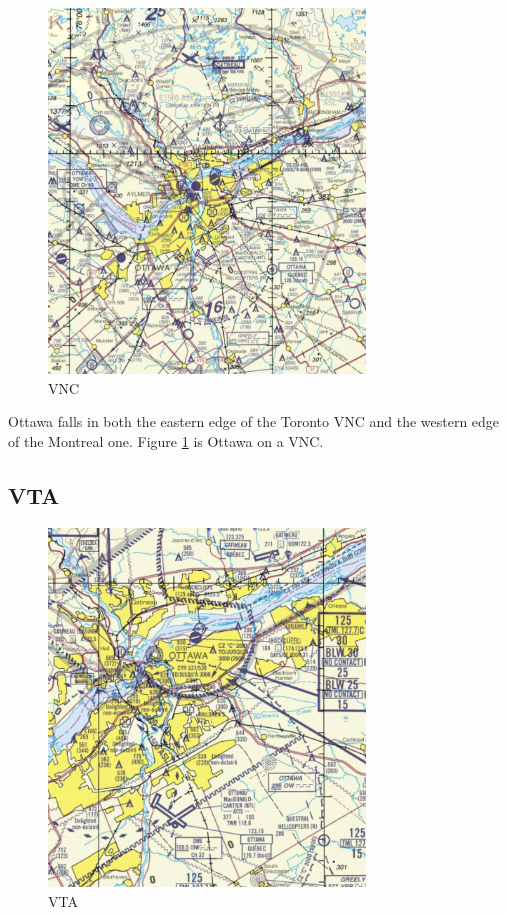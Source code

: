 \documentclass[12pt,letterpaper]{article}
\begin{document}
        \begin{figure}
            \centering
            \includegraphics[width=0.75\textwidth]{vnc.jpeg}
            \caption{VNC}
            \label{fig:vnc}
        \end{figure}

        Ottawa falls in both the eastern edge of the Toronto VNC and the western edge of the Montreal one. Figure \ref{fig:vnc} is Ottawa on a VNC.
        
        \subsection{VTA}
        \begin{figure}[H]
            \centering
            \includegraphics[width=0.75\textwidth]{vta.jpeg}
            \caption{VTA}
            \label{fig:vta}
        \end{figure}
        
\end{document}
